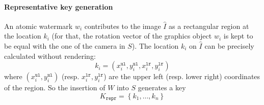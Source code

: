 \documentclass[a4paper,11pt,onecolumn]{memoir}
\begin{document}
\paragraph[Representative key generation]{Representative key generation}
An atomic watermark $w_i$ contributes to the image $\hat{I}$ as a rectangular region at the location $k_i$ (for that, the rotation vector of the graphics object $w_i$ is kept to be equal with the one of the camera in $S$). The location $k_i$ on $\hat{I}$ can be precisely calculated without rendering:
\begin{equation*}
    k_i = \left(x^{\mathtt{ul}}_i, y^{\mathtt{ul}}_{i},x^{\mathtt{lr}}_i, y^{\mathtt{lr}}_{i}\right)
\end{equation*}
where $\left(x^{\mathtt{ul}}_i, y^{\mathtt{ul}}_{i}\right)$ (resp. $x^{\mathtt{lr}}_i, y^{\mathtt{lr}}_{i}$) are the upper left (resp. lower right) coordinates of the region. So the insertion of $W$ into $S$ generates a key
\begin{equation*}
    K_{\mathtt{repr}} = \left\{k_1,\dots,k_n \right\}
\end{equation*}
\end{document}

